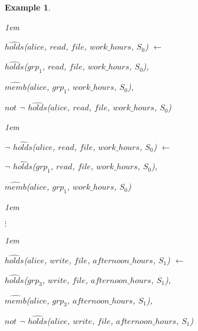 \documentclass[11pt]{report}
\newtheorem{vexample}{Example}[chapter]
\newenvironment{vquote}
{
  \begin{list}{}{\leftmargin 1em}\item[]
}
{
  \end{list}
}
\begin{document}
\begin{vexample}
\begin{enumerate}
              \begin{vquote}
                $\hat{holds}$($alice$, $read$, $file$, $work\_hours$, $S_0$) $\leftarrow$

                \hspace{1em}
                $\hat{holds}$($grp_1$, $read$, $file$, $work\_hours$, $S_0$),

                \hspace{1em}
                $\hat{memb}$($alice$, $grp_1$, $work\_hours$, $S_0$),

                \hspace{1em}
                $not$ $\lnot$ $\hat{holds}$($alice$, $read$, $file$, $work\_hours$, $S_0$)
              \end{vquote}

              \begin{vquote}
                $\lnot$ $\hat{holds}$($alice$, $read$, $file$, $work\_hours$, $S_0$) $\leftarrow$

                \hspace{1em}
                $\lnot$ $\hat{holds}$($grp_1$, $read$, $file$, $work\_hours$, $S_0$),

                \hspace{1em}
                $\hat{memb}$($alice$, $grp_1$, $work\_hours$, $S_0$)
              \end{vquote}

              \begin{vquote}
                \hspace{1em}
                $\vdots$
              \end{vquote}

              \begin{vquote}
                $\hat{holds}$($alice$, $write$, $file$, $afternoon\_hours$, $S_1$) $\leftarrow$

                \hspace{1em}
                $\hat{holds}$($grp_3$, $write$, $file$, $afternoon\_hours$, $S_1$),

                \hspace{1em}
                $\hat{memb}$($alice$, $grp_3$, $afternoon\_hours$, $S_1$),

                \hspace{1em}
                $not$ $\lnot$ $\hat{holds}$($alice$, $write$, $file$, $afternoon\_hours$, $S_1$)
              \end{vquote}


\end{enumerate}
\end{vexample}
\end{document}
